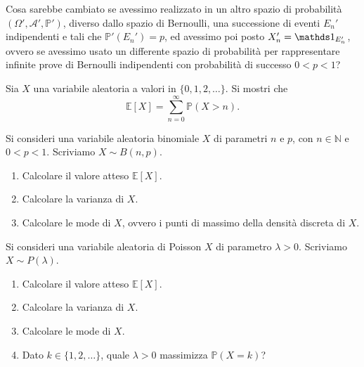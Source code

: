 Cosa sarebbe cambiato se avessimo realizzato in un altro spazio di probabilità $( \Omega ' ,\mathcal{A} ' ,\mathbb{P} ' )$, diverso dallo spazio di Bernoulli, una successione di eventi $E_{n} ' $ indipendenti e tali che $\mathbb{P} ' ( E_{n} ' ) =p$, ed avessimo poi posto $X_{n} ' =\Ind_{E_{n} ' }$, ovvero se avessimo usato un differente spazio di probabilità per rappresentare infinite prove di Bernoulli indipendenti con probabilità di successo $0< p< 1$?
\Esercizio{(*)}

Sia $X$ una variabile aleatoria a valori in $\{0,1,2,\dotsc \}$. Si mostri che
\begin{equation*}
\mathbb{E}[ X] =\sum\limits _{n=0}^{\infty }\mathbb{P}( X >n) .
\end{equation*}

Si consideri una variabile aleatoria binomiale $X$ di parametri $n$ e $p$, con $n\in \mathbb{N}$ e $0< p< 1$. Scriviamo $X\sim B( n,p)$.
\begin{enumerate}
\item Calcolare il valore atteso $\mathbb{E}[ X]$.
\item Calcolare la varianza di $X$.
\item Calcolare le mode di $X$, ovvero i punti di massimo della densità discreta di $X$.
\end{enumerate}

Si consideri una variabile aleatoria di Poisson $X$ di parametro $\lambda  >0$. Scriviamo $X\sim P( \lambda )$.
\begin{enumerate}
\item Calcolare il valore atteso $\mathbb{E}[ X]$.
\item Calcolare la varianza di $X$.
\item Calcolare le mode di $X$.
\item Dato $k\in \{1,2,\dotsc \}$, quale $\lambda  >0$ massimizza $\mathbb{P}( X=k)$?
\end{enumerate}

